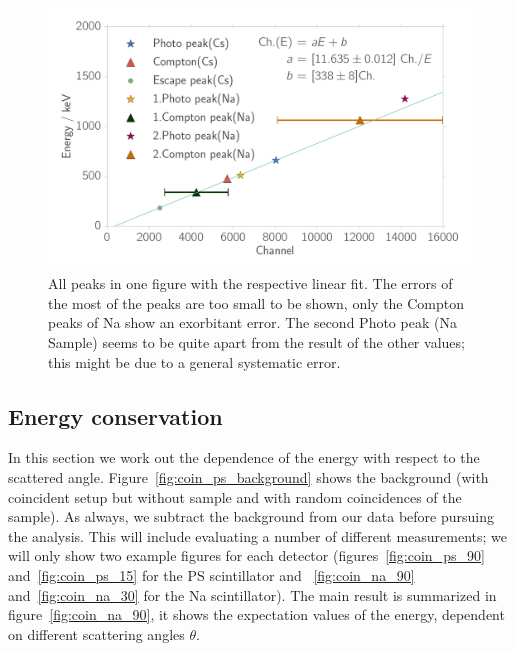 \begin{figure}[htpb]
    \centering
    \includegraphics[width=0.9\linewidth]{./analysis/figures/calibration_na_linear_fit}
    \caption{All peaks in one figure with the respective linear fit. The errors of
    the most of the peaks are too small to be shown, only the Compton peaks of Na show
    an exorbitant error. The second Photo peak (Na Sample) seems to be quite apart from
    the result of the other values; this might be due to a general systematic error.}
\label{fig:calibration_na_linear_fit}
\end{figure}
\clearpage
\subsection{Energy conservation}
\label{sub:energy_conservation}
In this section we work out the dependence of the energy with respect to the scattered
angle. Figure~\ref{fig:coin_ps_background} shows the background (with
coincident setup but without sample and with random coincidences of the sample).
As always, we subtract the background from our data before pursuing the analysis.
This will include evaluating a number of different measurements; we will
only show two example figures for each detector 
(figures~\ref{fig:coin_ps_90} and~\ref{fig:coin_ps_15} for the PS scintillator and 
~\ref{fig:coin_na_90} and~\ref{fig:coin_na_30} for the Na scintillator). The main
result is summarized in figure~\ref{fig:coin_na_90}, it shows the expectation values of
the energy, dependent on different scattering angles $\theta$.


